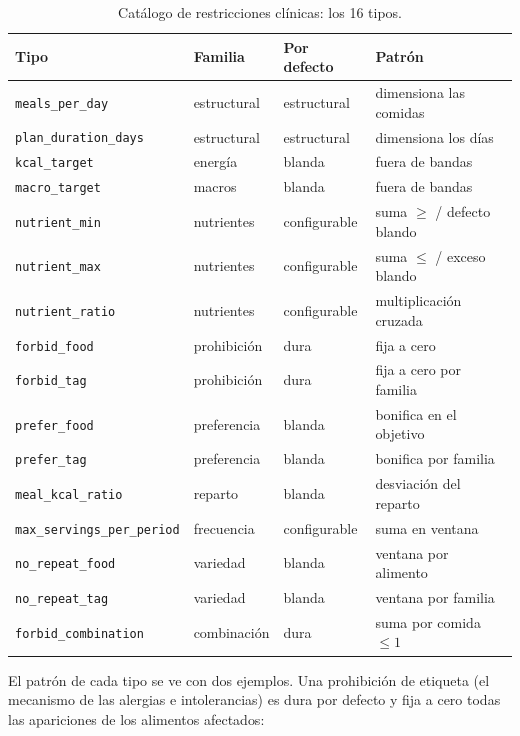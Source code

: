 \begin{table}[htbp]
\centering
\small
\begin{tabular}{|l|l|l|l|}
\hline
\textbf{Tipo} & \textbf{Familia} & \textbf{Por defecto} & \textbf{Patrón} \\
\hline
\texttt{meals\_per\_day} & estructural & estructural & dimensiona las comidas \\
\hline
\texttt{plan\_duration\_days} & estructural & estructural & dimensiona los días \\
\hline
\texttt{kcal\_target} & energía & blanda & fuera de bandas \\
\hline
\texttt{macro\_target} & macros & blanda & fuera de bandas \\
\hline
\texttt{nutrient\_min} & nutrientes & configurable & suma $\ge$ / defecto blando \\
\hline
\texttt{nutrient\_max} & nutrientes & configurable & suma $\le$ / exceso blando \\
\hline
\texttt{nutrient\_ratio} & nutrientes & configurable & multiplicación cruzada \\
\hline
\texttt{forbid\_food} & prohibición & dura & fija a cero \\
\hline
\texttt{forbid\_tag} & prohibición & dura & fija a cero por familia \\
\hline
\texttt{prefer\_food} & preferencia & blanda & bonifica en el objetivo \\
\hline
\texttt{prefer\_tag} & preferencia & blanda & bonifica por familia \\
\hline
\texttt{meal\_kcal\_ratio} & reparto & blanda & desviación del reparto \\
\hline
\texttt{max\_servings\_per\_period} & frecuencia & configurable & suma en ventana \\
\hline
\texttt{no\_repeat\_food} & variedad & blanda & ventana por alimento \\
\hline
\texttt{no\_repeat\_tag} & variedad & blanda & ventana por familia \\
\hline
\texttt{forbid\_combination} & combinación & dura & suma por comida $\le 1$ \\
\hline
\end{tabular}
\caption{Catálogo de restricciones clínicas: los 16 tipos.}
\label{tab:catalogoClinico}
\end{table}

El patrón de cada tipo se ve con dos ejemplos. Una prohibición de etiqueta (el mecanismo de las alergias e intolerancias) es dura por defecto y fija a cero todas las apariciones de los alimentos afectados:

